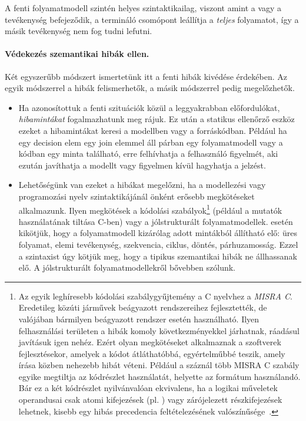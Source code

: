 A fenti folyamatmodell szintén helyes szintaktikailag, viszont amint a  vagy a  tevékenység befejeződik, a termináló csomópont leállítja a \emph{teljes} folyamatot, így a másik tevékenység nem fog tudni lefutni.

\paragraph{Védekezés szemantikai hibák ellen.}
Két egyszerűbb módszert ismertetünk itt a fenti hibák kivédése érdekében. Az egyik módszerrel a hibák felismerhetők, a másik módszerrel pedig megelőzhetők.

\begin{itemize}
	\item Ha azonosítottuk a fenti szituációk közül a leggyakrabban előfordulókat, \emph{hibamintákat} fogalmazhatunk meg rájuk. Ez után a statikus ellenőrző eszköz ezeket a hibamintákat keresi a modellben vagy a forráskódban. Például ha egy decision elem egy join elemmel áll párban egy folyamatmodell vagy a kódban egy  minta található, erre felhívhatja a felhasználó figyelmét, aki ezután javíthatja a modellt vagy figyelmen kívül hagyhatja a jelzést.

	\item Lehetőségünk van ezeket a hibákat megelőzni, ha a modellezési vagy programozási nyelv szintaktikájánál önként erősebb megkötéseket alkalmazunk. Ilyen megkötések a kódolási szabályok\footnote{Az egyik leghíresebb kódolási szabálygyűjtemény a C nyelvhez a \emph{MISRA C}. Eredetileg közúti járművek beágyazott rendszereihez fejlesztették, de valójában bármilyen beágyazott rendszer esetén használható. Ilyen felhasználási területen a hibák komoly következményekkel járhatnak, ráadásul javításuk igen nehéz. Ezért olyan megkötéseket alkalmaznak a szoftverek fejlesztésekor, amelyek a kódot átláthatóbbá, egyértelműbbé teszik, amely írása közben nehezebb hibát véteni. Például a száznál több MISRA C szabály egyike megtiltja az  kódrészlet használatát, helyette az  formátum használandó. Bár ez a két kódrészlet nyilvánvalóan ekvivalens, ha a logikai műveletek operandusai csak atomi kifejezések (pl. ) vagy zárójelezett részkifejezések lehetnek, kisebb egy hibás precedencia feltételezésének valószínűsége~\cite{Wong:2003}.\kiegeszitoanyag} (például a mutatók használatának tiltása C-ben) vagy a jólstrukturált folyamatmodellek.  esetén kikötjük, hogy a folyamatmodell kizárólag adott mintákból állítható elő: üres folyamat, elemi tevékenység, szekvencia, ciklus, döntés, párhuzamosság. Ezzel a szintaxist úgy kötjük meg, hogy a tipikus szemantikai hibák ne állhassanak elő. A jólstrukturált folyamatmodellekről bővebben  szólunk.
\end{itemize}

